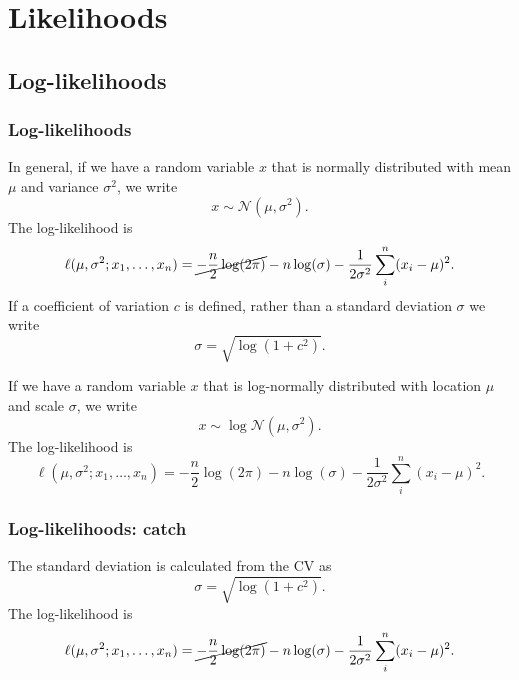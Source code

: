 \documentclass{beamer}
\begin{document}
\section{Likelihoods}


\subsection{Log-likelihoods}
\begin{frame}
\frametitle{Log-likelihoods}
In general, if we have a random variable $x$ that is normally distributed with
mean $\mu$ and variance $\sigma^2$, we write
\begin{equation*}
  x \sim \mathcal{N} \left(\mu, \sigma^2 \right).
\end{equation*}
The log-likelihood is
\begin{equation*}
  \ell(\mu,\sigma^2; x_1,\ldots,x_n) = \cancel{-\frac{n}{2} \log (2 \pi)} - n \log (\sigma) -
  \frac{1}{2\sigma^2} \sum_i^n (x_i - \mu)^2.
\end{equation*}
If a coefficient of variation $c$ is defined, rather than a standard deviation
$\sigma$ we write
\begin{equation*}
  \sigma = \sqrt{\log \left( 1+c^2 \right)}.
\end{equation*}


If we have a random variable $x$ that is log-normally distributed with
location $\mu$ and scale $\sigma$, we write
\begin{equation*}
  x \sim \log \mathcal{N} \left(\mu, \sigma^2 \right).
\end{equation*}
The log-likelihood is
\begin{equation*}
  \ell(\mu,\sigma^2; x_1,\ldots,x_n) = -\frac{n}{2} \log (2 \pi) - n \log (\sigma) -
  \frac{1}{2\sigma^2} \sum_i^n (x_i - \mu)^2.
\end{equation*}
\end{frame}


\begin{frame}
\frametitle{Log-likelihoods: catch}
The standard deviation is calculated from the CV as
\begin{equation*}
  \sigma = \sqrt{\log \left( 1+c^2 \right)}.
\end{equation*}
The log-likelihood is
\begin{equation*}
  \ell(\mu,\sigma^2; x_1,\ldots,x_n) = \cancel{-\frac{n}{2} \log (2 \pi)} - n \log (\sigma) -
  \frac{1}{2\sigma^2} \sum_i^n (x_i - \mu)^2.
\end{equation*}
\end{frame}
\end{document}
